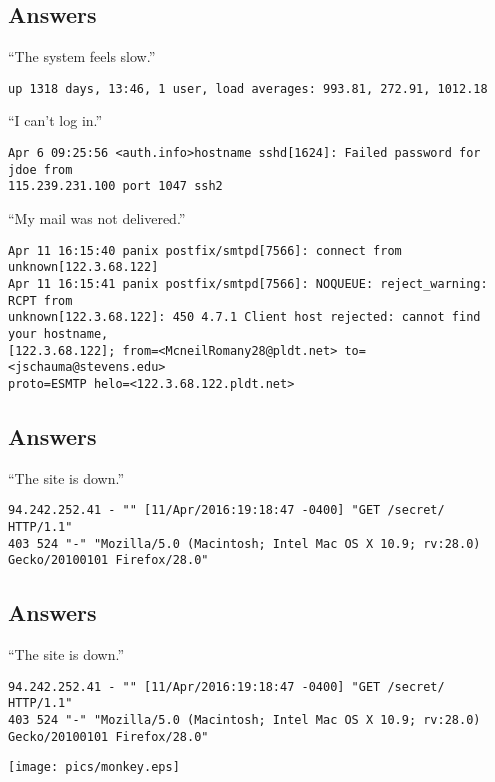 \documentclass[xga]{xdvislides}
\begin{document}
\subsection{Answers}
``The system feels slow.''
\begin{verbatim}
up 1318 days, 13:46, 1 user, load averages: 993.81, 272.91, 1012.18
\end{verbatim}

\addvspace{.3in}
``I can't log in.''
\begin{verbatim}
Apr 6 09:25:56 <auth.info>hostname sshd[1624]: Failed password for jdoe from
115.239.231.100 port 1047 ssh2
\end{verbatim}

\addvspace{.3in}
``My mail was not delivered.''
\begin{verbatim}
Apr 11 16:15:40 panix postfix/smtpd[7566]: connect from unknown[122.3.68.122]
Apr 11 16:15:41 panix postfix/smtpd[7566]: NOQUEUE: reject_warning: RCPT from
unknown[122.3.68.122]: 450 4.7.1 Client host rejected: cannot find your hostname,
[122.3.68.122]; from=<McneilRomany28@pldt.net> to=<jschauma@stevens.edu>
proto=ESMTP helo=<122.3.68.122.pldt.net>
\end{verbatim}

\subsection{Answers}
``The site is down.'' \\

\begin{verbatim}
94.242.252.41 - "" [11/Apr/2016:19:18:47 -0400] "GET /secret/ HTTP/1.1"
403 524 "-" "Mozilla/5.0 (Macintosh; Intel Mac OS X 10.9; rv:28.0)
Gecko/20100101 Firefox/28.0"
\end{verbatim}

\subsection{Answers}
``The site is down.'' \\

\begin{verbatim}
94.242.252.41 - "" [11/Apr/2016:19:18:47 -0400] "GET /secret/ HTTP/1.1"
403 524 "-" "Mozilla/5.0 (Macintosh; Intel Mac OS X 10.9; rv:28.0)
Gecko/20100101 Firefox/28.0"
\end{verbatim}

\addvspace{.2in}
\begin{center}
	\texttt{[image: pics/monkey.eps]}
\end{center}
\end{document}
